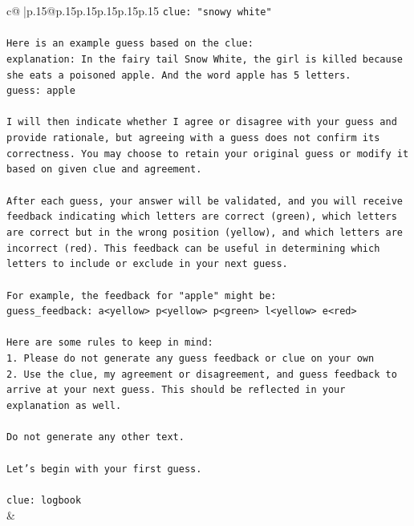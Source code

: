 \documentclass{article}
\begin{document}
{\begin{supertabular}{c@{$\;$}|p{.15\linewidth}@{}p{.15\linewidth}p{.15\linewidth}p{.15\linewidth}p{.15\linewidth}p{.15\linewidth}}
{{{\texttt{clue: "snowy white"} \\
\\ 
\texttt{Here is an example guess based on the clue:} \\
\texttt{explanation: In the fairy tail Snow White, the girl is killed because she eats a poisoned apple. And the word apple has 5 letters.} \\
\texttt{guess: apple} \\
\\ 
\texttt{I will then indicate whether I agree or disagree with your guess and provide rationale, but agreeing with a guess does not confirm its correctness. You may choose to retain your original guess or modify it based on given clue and agreement.} \\
\\ 
\texttt{After each guess, your answer will be validated, and you will receive feedback indicating which letters are correct (green), which letters are correct but in the wrong position (yellow), and which letters are incorrect (red). This feedback can be useful in determining which letters to include or exclude in your next guess.} \\
\\ 
\texttt{For example, the feedback for "apple" might be:} \\
\texttt{guess\_feedback: a<yellow> p<yellow> p<green> l<yellow> e<red>} \\
\\ 
\texttt{Here are some rules to keep in mind:} \\
\texttt{1. Please do not generate any guess feedback or clue on your own} \\
\texttt{2. Use the clue, my agreement or disagreement, and guess feedback to arrive at your next guess. This should be reflected in your explanation as well.} \\
\\ 
\texttt{Do not generate any other text.} \\
\\ 
\texttt{Let's begin with your first guess.} \\
\\ 
\texttt{clue: logbook} \\
            }
        }
    }
    & \\ \\


\end{supertabular}}
\end{document}
